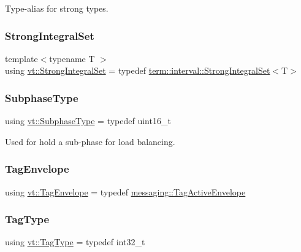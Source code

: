 Type-\/alias for strong types. 

\mbox{\label{namespacevt_aaefb2bd6d08c8dc0ff26ed43636611b1}} 
\subsubsection{\texorpdfstring{Strong\+Integral\+Set}{StrongIntegralSet}}
{\footnotesize\ttfamily template$<$typename T $>$ \\
using \hyperlink{namespacevt_aaefb2bd6d08c8dc0ff26ed43636611b1}{vt\+::\+Strong\+Integral\+Set} = typedef \hyperlink{structvt_1_1term_1_1interval_1_1_strong_integral_set}{term\+::interval\+::\+Strong\+Integral\+Set}$<$T$>$}

\mbox{\label{namespacevt_ae78cbfdf1e57470e33eedb074f2beeba}} 
\subsubsection{\texorpdfstring{Subphase\+Type}{SubphaseType}}
{\footnotesize\ttfamily using \hyperlink{namespacevt_ae78cbfdf1e57470e33eedb074f2beeba}{vt\+::\+Subphase\+Type} = typedef uint16\+\_\+t}



Used for hold a sub-\/phase for load balancing. 

\mbox{\label{namespacevt_a7b951ab92dca9319e12e3fc406ccb309}} 
\subsubsection{\texorpdfstring{Tag\+Envelope}{TagEnvelope}}
{\footnotesize\ttfamily using \hyperlink{namespacevt_a7b951ab92dca9319e12e3fc406ccb309}{vt\+::\+Tag\+Envelope} = typedef \hyperlink{structvt_1_1messaging_1_1_tag_active_envelope}{messaging\+::\+Tag\+Active\+Envelope}}

\mbox{\label{namespacevt_a84ab281dae04a52a4b243d6bf62d0e52}} 
\subsubsection{\texorpdfstring{Tag\+Type}{TagType}}
{\footnotesize\ttfamily using \hyperlink{namespacevt_a84ab281dae04a52a4b243d6bf62d0e52}{vt\+::\+Tag\+Type} = typedef int32\+\_\+t}



